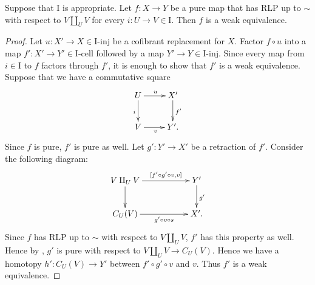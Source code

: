 \documentclass{amsart}
\theoremstyle{definition}
\newcommand{\I}{\mathrm{I}}
\newcommand{\class}[2]{#1\text{-}\mathrm{#2}}
\newcommand{\Iinj}[1][\I]{\class{#1}{inj}}
\newcommand{\Icell}[1][\I]{\class{#1}{cell}}
\begin{document}
\begin{prop}[pure-we]
Suppose that $\I$ is appropriate.
Let $f : X \to Y$ be a pure map that has RLP up to $\sim$ with respect to $V \amalg_U V$ for every $i : U \to V \in \I$.
Then $f$ is a weak equivalence.
\end{prop}
\begin{proof}
Let $u : X' \to X \in \Iinj$ be a cofibrant replacement for $X$.
Factor $f \circ u$ into a map $f' : X' \to Y' \in \Icell$ followed by a map $Y' \to Y \in \Iinj$.
Since every map from $i \in \I$ to $f$ factors through $f'$, it is enough to show that $f'$ is a weak equivalence.
Suppose that we have a commutative square
\[ \xymatrix{ U \ar[r]^u \ar[d]_i & X' \ar[d]^{f'} \\
              V \ar[r]_v          & Y'.
            } \]
Since $f$ is pure, $f'$ is pure as well.
Let $g' : Y' \to X'$ be a retraction of $f'$.
Consider the following diagram:
\[ \xymatrix{ V \amalg_U V \ar[rr]^-{[f' \circ g' \circ v, v]} \ar[d] & & Y' \ar[d]^{g'} \\
              C_U(V)       \ar[rr]_-{g' \circ v \circ s}              & & X'.
            } \]
Since $f$ has RLP up to $\sim$ with respect to $V \amalg_U V$, $f'$ has this property as well.
Hence by , $g'$ is pure with respect to $V \amalg_U V \to C_U(V)$.
Hence we have a homotopy $h' : C_U(V) \to Y'$ between $f' \circ g' \circ v$ and $v$.
Thus $f'$ is a weak equivalence.
\end{proof}
\end{document}
